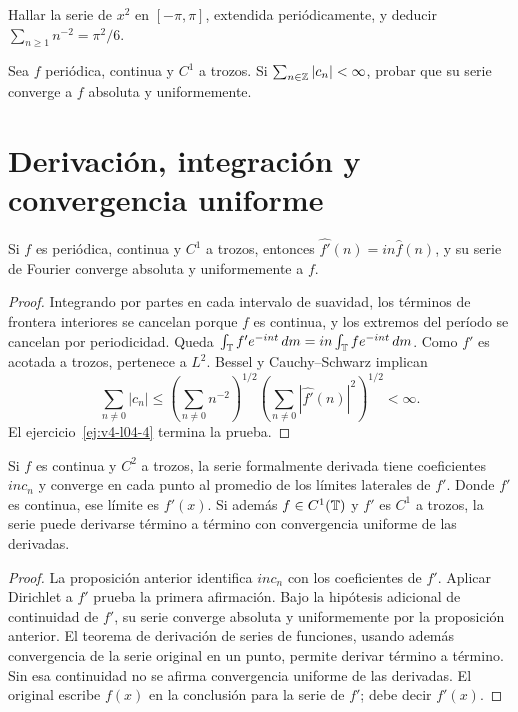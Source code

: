 \begin{ejercicio}\label{ej:v4-l04-3}
Hallar la serie de $x^2$ en $[-\pi,\pi]$, extendida periódicamente, y deducir $\sum_{n\geq1}n^{-2}=\pi^2/6$.
\end{ejercicio}

\begin{ejercicio}\label{ej:v4-l04-4}
Sea $f$ periódica, continua y $C^1$ a trozos. Si $\sum_{n\in\mathbb Z}|c_n|<\infty$, probar que su serie converge a $f$ absoluta y uniformemente.
\end{ejercicio}


\section{Derivación, integración y convergencia uniforme}\label{lectura:v4-05}
\begin{proposicion}
Si $f$ es periódica, continua y $C^1$ a trozos, entonces $\widehat{f'}(n)=in\widehat f(n)$, y su serie de Fourier converge absoluta y uniformemente a $f$.
\end{proposicion}
\begin{proof}
Integrando por partes en cada intervalo de suavidad, los términos de frontera interiores se cancelan porque $f$ es continua, y los extremos del período se cancelan por periodicidad. Queda $\int_\mathbb T f'e^{-int}\,dm=in\int_\mathbb T fe^{-int}\,dm$. Como $f'$ es acotada a trozos, pertenece a $L^2$. Bessel y Cauchy--Schwarz implican
\[
 \sum_{n\ne0}|c_n|
 \leq\left(\sum_{n\ne0}n^{-2}\right)^{1/2}
 \left(\sum_{n\ne0}|\widehat{f'}(n)|^2\right)^{1/2}<\infty.
\]
El ejercicio~\ref{ej:v4-l04-4} termina la prueba.
\end{proof}
\begin{proposicion}
Si $f$ es continua y $C^2$ a trozos, la serie formalmente derivada tiene coeficientes $inc_n$ y converge en cada punto al promedio de los límites laterales de $f'$. Donde $f'$ es continua, ese límite es $f'(x)$. Si además $f\in C^1(\mathbb T)$ y $f'$ es $C^1$ a trozos, la serie puede derivarse término a término con convergencia uniforme de las derivadas.
\end{proposicion}
\begin{proof}
La proposición anterior identifica $inc_n$ con los coeficientes de $f'$. Aplicar Dirichlet a $f'$ prueba la primera afirmación. Bajo la hipótesis adicional de continuidad de $f'$, su serie converge absoluta y uniformemente por la proposición anterior. El teorema de derivación de series de funciones, usando además convergencia de la serie original en un punto, permite derivar término a término. Sin esa continuidad no se afirma convergencia uniforme de las derivadas. El original escribe $f(x)$ en la conclusión para la serie de $f'$; debe decir $f'(x)$.
\end{proof}
